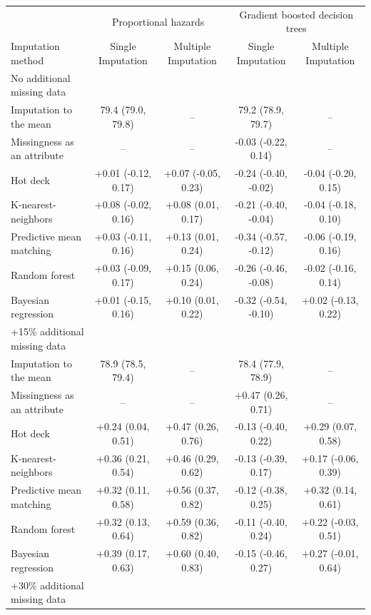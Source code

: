 \documentclass{article}
\begin{document}
\begin{table}
\begin{tabular}{lcccc}
\toprule
& \multicolumn{2}{c}{Proportional hazards} & \multicolumn{2}{c}{Gradient boosted decision trees} \\ 
 \cmidrule(lr){2-3}\cmidrule(lr){4-5}
Imputation method & Single Imputation & Multiple Imputation & Single Imputation & Multiple Imputation \\ 
\midrule
\multicolumn{1}{l}{No additional missing data} \\ 
\midrule
Imputation to the mean & 79.4 (79.0, 79.8) & -- & 79.2 (78.9, 79.7) & -- \\ 
Missingness as an attribute & -- & -- & -0.03 (-0.22, 0.14) & -- \\ 
Hot deck & +0.01 (-0.12, 0.17) & +0.07 (-0.05, 0.23) & -0.24 (-0.40, -0.02) & -0.04 (-0.20, 0.15) \\ 
K-nearest-neighbors & +0.08 (-0.02, 0.16) & +0.08 (0.01, 0.17) & -0.21 (-0.40, -0.04) & -0.04 (-0.18, 0.10) \\ 
Predictive mean matching & +0.03 (-0.11, 0.16) & +0.13 (0.01, 0.24) & -0.34 (-0.57, -0.12) & -0.06 (-0.19, 0.16) \\ 
Random forest & +0.03 (-0.09, 0.17) & +0.15 (0.06, 0.24) & -0.26 (-0.46, -0.08) & -0.02 (-0.16, 0.14) \\ 
Bayesian regression & +0.01 (-0.15, 0.16) & +0.10 (0.01, 0.22) & -0.32 (-0.54, -0.10) & +0.02 (-0.13, 0.22) \\ 
\midrule
\multicolumn{1}{l}{+15\% additional missing data} \\ 
\midrule
Imputation to the mean & 78.9 (78.5, 79.4) & -- & 78.4 (77.9, 78.9) & -- \\ 
Missingness as an attribute & -- & -- & +0.47 (0.26, 0.71) & -- \\ 
Hot deck & +0.24 (0.04, 0.51) & +0.47 (0.26, 0.76) & -0.13 (-0.40, 0.22) & +0.29 (0.07, 0.58) \\ 
K-nearest-neighbors & +0.36 (0.21, 0.54) & +0.46 (0.29, 0.62) & -0.13 (-0.39, 0.17) & +0.17 (-0.06, 0.39) \\ 
Predictive mean matching & +0.32 (0.11, 0.58) & +0.56 (0.37, 0.82) & -0.12 (-0.38, 0.25) & +0.32 (0.14, 0.61) \\ 
Random forest & +0.32 (0.13, 0.64) & +0.59 (0.36, 0.82) & -0.11 (-0.40, 0.24) & +0.22 (-0.03, 0.51) \\ 
Bayesian regression & +0.39 (0.17, 0.63) & +0.60 (0.40, 0.83) & -0.15 (-0.46, 0.27) & +0.27 (-0.01, 0.64) \\ 
\midrule
\multicolumn{1}{l}{+30\% additional missing data} \\ 

\end{tabular}
\end{table}
\end{document}
